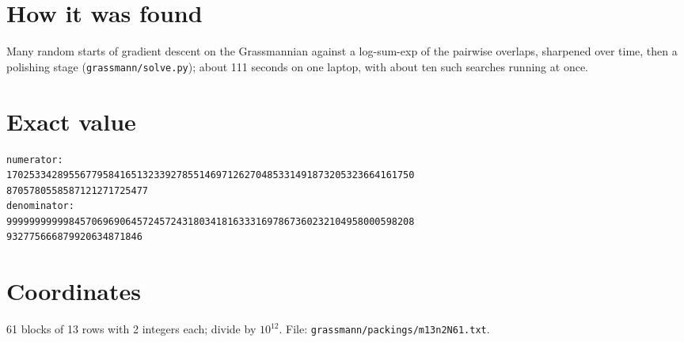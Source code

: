\documentclass[11pt,a4paper]{article}
\begin{document}
\section{How it was found}
Many random starts of gradient descent on the Grassmannian against a log-sum-exp of the pairwise overlaps, sharpened over time, then a polishing stage (\texttt{grassmann/solve.py}); about 111 seconds on one laptop, with about ten such searches running at once.


\appendix
\section{Exact value}
{\small
\begin{verbatim}
numerator:
170253342895567795841651323392785514697126270485331491873205323664161750
8705780558587121271725477
denominator:
999999999998457069690645724572431803418163331697867360232104958000598208
932775666879920634871846
\end{verbatim}}

\section{Coordinates}
61 blocks of 13 rows with 2 integers each; divide by $10^{12}$. File: \texttt{grassmann/packings/m13n2N61.txt}.
{\tiny
\begin{multicols}{4}
\end{multicols}}
\end{document}
